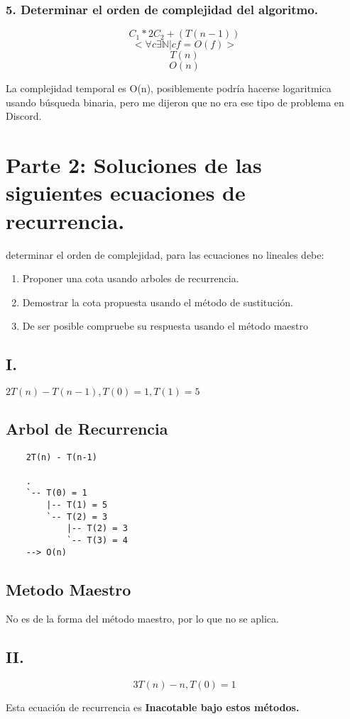 \documentclass[12pt]{exam}
\begin{document}
\subsubsection*{5. Determinar el orden de complejidad del algoritmo.}
$$ C_1*2C_2+(T(n-1)) $$
$$ <\forall c \exists \mathbb{N} | cf = O(f)> $$
$$ T(n) $$
$$ O(n) $$

La complejidad temporal es O(n), posiblemente podría hacerse logaritmica 
usando búsqueda binaria, pero me dijeron que no era ese tipo de problema 
en Discord.

\section*{Parte 2: Soluciones de las siguientes ecuaciones de recurrencia.}
determinar el orden de complejidad, para las ecuaciones no lineales debe:
\begin{enumerate}
    \item Proponer una cota usando arboles de recurrencia.
    \item Demostrar la cota propuesta usando el método de sustitución.
    \item De ser posible compruebe su respuesta usando el método maestro
\end{enumerate}
\subsection*{I.}
$ 2T(n) - T(n-1), T(0)=1, T(1)=5 $
\subsection*{Arbol de Recurrencia}
\begin{verbatim}
    2T(n) - T(n-1)

    .
    `-- T(0) = 1
        |-- T(1) = 5
        `-- T(2) = 3
            |-- T(2) = 3 
            `-- T(3) = 4
    --> O(n)
\end{verbatim}

\subsection*{Metodo Maestro}
No es de la forma del método maestro, por lo que no se aplica.

\subsection*{II.}
$$ 3T(n) - n, T(0)=1 $$

Esta ecuación de recurrencia es \textbf{Inacotable bajo estos métodos.}
\end{document}

